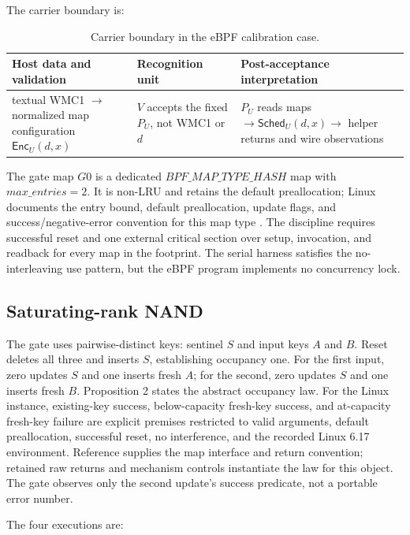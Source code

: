 \documentclass[conference]{IEEEtran}
\begin{document}
The carrier boundary is:

\begin{table}[t]
\caption{Carrier boundary in the eBPF calibration case.}
\label{tab:carrier-boundary}
\centering
\begin{tabularx}{\textwidth}{@{}Y Y Y@{}}
\toprule
Host data and validation & Recognition unit & Post-acceptance interpretation \\
\midrule
textual WMC1 $\rightarrow$ normalized map configuration $\mathsf{Enc}_U(d,x)$ & $V$ accepts the fixed $P_U$, not WMC1 or $d$ & $P_U$ reads maps $\rightarrow\mathsf{Sched}_U(d,x)\rightarrow$ helper returns and wire observations \\
\bottomrule
\end{tabularx}
\end{table}

The gate map $G0$ is a dedicated $\mathit{BPF\_MAP\_TYPE\_HASH}$ map with $\mathit{max\_entries}=2$. It is non-LRU and retains the default preallocation; Linux documents the entry bound, default preallocation, update flags, and success/negative-error convention for this map type \cite{ref8}. The discipline requires successful reset and one external critical section over setup, invocation, and readback for every map in the footprint. The serial harness satisfies the no-interleaving use pattern, but the eBPF program implements no concurrency lock.

\subsection{Saturating-rank NAND}

The gate uses pairwise-distinct keys: sentinel $S$ and input keys $A$ and $B$. Reset deletes all three and inserts $S$, establishing occupancy one. For the first input, zero updates $S$ and one inserts fresh $A$; for the second, zero updates $S$ and one inserts fresh $B$. Proposition 2 states the abstract occupancy law. For the Linux instance, existing-key success, below-capacity fresh-key success, and at-capacity fresh-key failure are explicit premises restricted to valid arguments, default preallocation, successful reset, no interference, and the recorded Linux 6.17 environment. Reference \cite{ref8} supplies the map interface and return convention; retained raw returns and mechanism controls instantiate the law for this object. The gate observes only the second update's success predicate, not a portable error number.

The four executions are:
\end{document}
